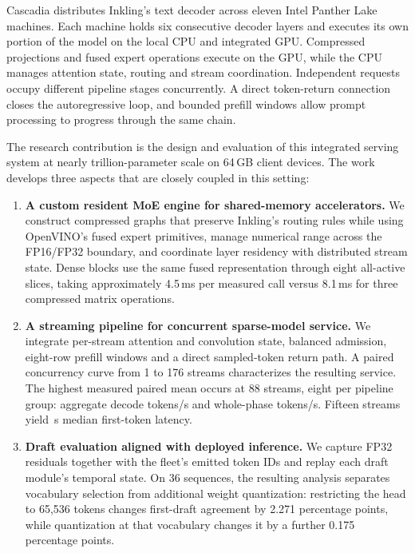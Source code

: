 \documentclass[11pt]{article}
\begin{document}
Cascadia distributes Inkling's text decoder across eleven Intel Panther Lake machines. Each machine holds six consecutive decoder layers and executes its own portion of the model on the local CPU and integrated GPU. Compressed projections and fused expert operations execute on the GPU, while the CPU manages attention state, routing and stream coordination. Independent requests occupy different pipeline stages concurrently. A direct token-return connection closes the autoregressive loop, and bounded prefill windows allow prompt processing to progress through the same chain.

The research contribution is the design and evaluation of this integrated serving system at nearly trillion-parameter scale on 64\,GB client devices. The work develops three aspects that are closely coupled in this setting:

\begin{enumerate}
\item \textbf{A custom resident MoE engine for shared-memory accelerators.} We construct compressed graphs that preserve Inkling's routing rules while using OpenVINO's fused expert primitives, manage numerical range across the FP16/FP32 boundary, and coordinate layer residency with distributed stream state. Dense blocks use the same fused representation through eight all-active slices, taking approximately 4.5\,ms per measured call versus 8.1\,ms for three compressed matrix operations.
\item \textbf{A streaming pipeline for concurrent sparse-model service.} We integrate per-stream attention and convolution state, balanced admission, eight-row prefill windows and a direct sampled-token return path. A paired concurrency curve from 1 to 176 streams characterizes the resulting service. The highest measured paired mean occurs at 88 streams, eight per pipeline group: \SurveyDecode{} aggregate decode tokens/s and \SurveyPhase{} whole-phase tokens/s. Fifteen streams yield \SurveyTTFT{}\,s median first-token latency.
\item \textbf{Draft evaluation aligned with deployed inference.} We capture FP32 residuals together with the fleet's emitted token IDs and replay each draft module's temporal state. On 36 sequences, the resulting analysis separates vocabulary selection from additional weight quantization: restricting the head to 65,536 tokens changes first-draft agreement by 2.271 percentage points, while quantization at that vocabulary changes it by a further 0.175 percentage points.
\end{enumerate}
\end{document}
